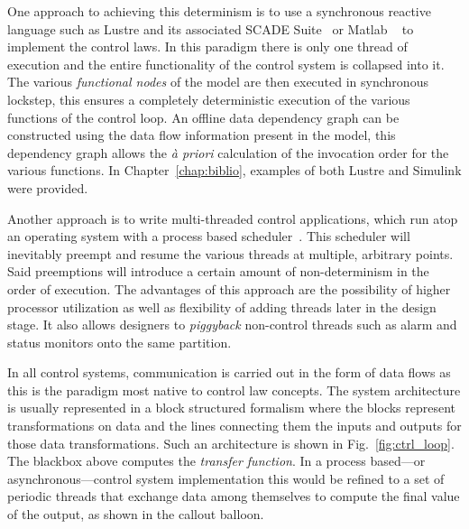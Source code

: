 One approach to achieving this determinism is to use a synchronous
reactive language such as Lustre and its associated SCADE
Suite~\cite{halbwachs@ieee91} or Matlab \simu~\cite{simulink} to
implement the control laws. In this paradigm there is only one thread
of execution and the entire functionality of the control system is
collapsed into it. The various \emph{functional nodes} of the model
are then executed in synchronous lockstep, this ensures a completely
deterministic execution of the various functions of the control
loop. An offline data dependency graph can be constructed using the
data flow information present in the model, this dependency graph
allows the \emph{\`a priori} calculation of the invocation order for
the various functions. In Chapter~\ref{chap:biblio}, examples of both
Lustre and Simulink were provided.

Another approach is to write multi-threaded control applications,
which run atop an operating system with a process based
scheduler~\cite{butler@spie93}. This scheduler will inevitably preempt
and resume the various threads at multiple, arbitrary points. Said
preemptions will introduce a certain amount of non-determinism in the
order of execution. The advantages of this approach are the
possibility of higher processor utilization as well as flexibility of
adding threads later in the design stage. It also allows designers to
\emph{piggyback} non-control threads such as alarm and status monitors
onto the same partition.

In all control systems, communication is carried out in the form of
data flows as this is the paradigm most native to control law
concepts. The system architecture is usually represented in a block
structured formalism where the blocks represent transformations on
data and the lines connecting them the inputs and outputs for those
data transformations. Such an architecture is shown in
Fig.~\ref{fig:ctrl_loop}. The blackbox above computes the
\emph{transfer function}. In a process based---or
asynchronous---control system implementation this would be refined to
a set of periodic threads that exchange data among themselves to
compute the final value of the output, as shown in the callout
balloon.

